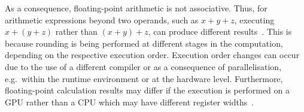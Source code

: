 \documentclass[runningheads,twocolumn,a4paper,10pt]{llncs}
\begin{document}
%
As a consequence, floating-point arithmetic is not associative. Thus, for arithmetic expressions beyond two operands, such as $x+y+z$, executing $x+(y+z)$ rather than $(x+y)+z$, can produce different results~\cite{Kapre2007}. This is because rounding is being performed at different stages in the computation, depending on the respective execution order. 
%
Execution order changes can occur due to the use of a different compiler or as a consequence of parallelisation, e.g.\ within the runtime environment or at the hardware level. 
%
Furthermore, floating-point calculation results may differ if the execution is performed on a GPU rather than a CPU which may have different register widths~\cite{Whitehead2011}. 
%
%
%
\end{document}
